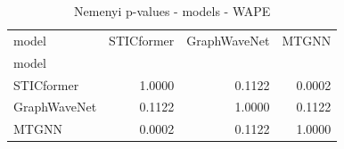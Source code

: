 \begin{table}
\caption{Nemenyi p-values - models - WAPE}
\label{tab:nemenyi_models_wape}
\begin{tabular}{lrrr}
\toprule
model & STICformer & GraphWaveNet & MTGNN \\
model &  &  &  \\
\midrule
STICformer & 1.0000 & 0.1122 & 0.0002 \\
GraphWaveNet & 0.1122 & 1.0000 & 0.1122 \\
MTGNN & 0.0002 & 0.1122 & 1.0000 \\
\bottomrule
\end{tabular}
\end{table}
